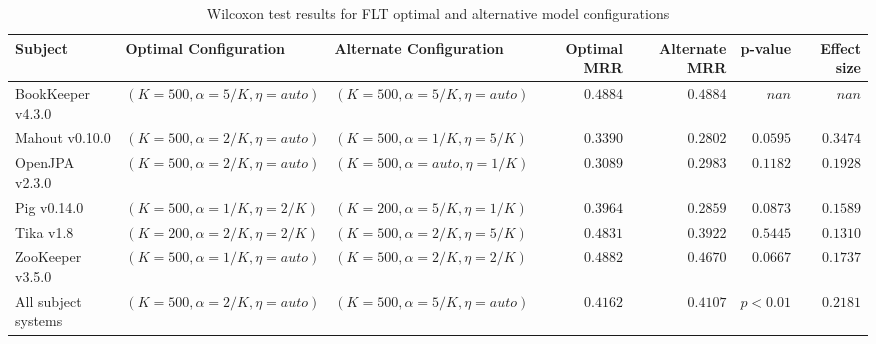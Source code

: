 \begin{landscape}

\begin{table}
\begin{spacing}{1.2}
\centering
\caption{Wilcoxon test results for FLT optimal and alternative model configurations}
\label{table:combo-flt-model-sweep-wilcox}
\begin{tabular}{lllrrrr}
\toprule
                      Subject &             Optimal Configuration &           Alternate Configuration & Optimal MRR & Alternate MRR &  p-value & Effect size \\
\midrule
            BookKeeper v4.3.0 &  $(K=500, \alpha=5/K, \eta=auto)$ &  $(K=500, \alpha=5/K, \eta=auto)$ &    $0.4884$ &      $0.4884$ &    $nan$ &       $nan$ \\
               Mahout v0.10.0 &  $(K=500, \alpha=2/K, \eta=auto)$ &   $(K=500, \alpha=1/K, \eta=5/K)$ &    $0.3390$ &      $0.2802$ & $0.0595$ &    $0.3474$ \\
               OpenJPA v2.3.0 &  $(K=500, \alpha=2/K, \eta=auto)$ &  $(K=500, \alpha=auto, \eta=1/K)$ &    $0.3089$ &      $0.2983$ & $0.1182$ &    $0.1928$ \\
                  Pig v0.14.0 &   $(K=500, \alpha=1/K, \eta=2/K)$ &   $(K=200, \alpha=5/K, \eta=1/K)$ &    $0.3964$ &      $0.2859$ & $0.0873$ &    $0.1589$ \\
                    Tika v1.8 &   $(K=200, \alpha=2/K, \eta=2/K)$ &   $(K=500, \alpha=2/K, \eta=5/K)$ &    $0.4831$ &      $0.3922$ & $0.5445$ &    $0.1310$ \\
             ZooKeeper v3.5.0 &  $(K=500, \alpha=1/K, \eta=auto)$ &   $(K=500, \alpha=2/K, \eta=2/K)$ &    $0.4882$ &      $0.4670$ & $0.0667$ &    $0.1737$ \\
 \midrule
All subject systems &  $(K=500, \alpha=2/K, \eta=auto)$ &  $(K=500, \alpha=5/K, \eta=auto)$ &    $0.4162$ &      $0.4107$ & $p<0.01$ &    $0.2181$ \\
\bottomrule
\end{tabular}

\end{spacing}
\end{table}



\end{landscape}
